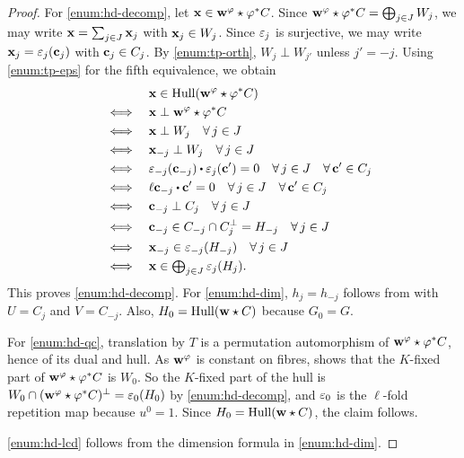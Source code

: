 \documentclass[twocolumn, 11pt]{scrartcl}
\begin{document}
\begin{proof}
    For \ref{enum:hd-decomp}, let $\mathbf{x}\in\mathbf{w}^\varphi\star\varphi^*C$. Since $\mathbf{w}^\varphi\star\varphi^*C=\bigoplus_{j\in J} W_j$, we may write $\mathbf{x}=\sum_{j\in J}\mathbf{x}_j$ with $\mathbf{x}_j\in W_j$. Since $\varepsilon_{j}$ is surjective, we may write $\mathbf{x}_{j}=\varepsilon_{j}(\mathbf{c}_j)$ with $\mathbf{c}_j\in C_j$. By \ref{enum:tp-orth}, $W_j\perp W_{j'}$ unless $j'=-j$. Using \ref{enum:tp-eps} for the fifth equivalence, we obtain
    \begin{align*}
             & \bfx\in\Hull(\bfw^\varphi\star\varphi^*C) \\
        \qiff& \bfx\perp\bfw^\varphi\star \varphi^*C \\
        \qiff& \bfx\perp W_j\quad\forall j\in J \\
        \qiff& \bfx_{-j}\perp W_j\quad\forall j\in J \\
        \qiff& \eps_{-j}(\bfc_{-j})\dotpr\eps_j(\bfc')=0\quad\forall j\in J\quad\forall \bfc'\in C_j \\
        \qiff& \ell\bfc_{-j}\dotpr\bfc'=0 \quad\forall j\in J\quad\forall\bfc'\in C_j \\
        \qiff& \bfc_{-j}\perp C_j\quad\forall j\in J \\
        \qiff& \bfc_{-j}\in C_{-j}\cap C_j^\perp=H_{-j}\quad\forall j\in J \\
        \qiff& \bfx_{-j}\in\eps_{-j}(H_{-j})\quad\forall j\in J \\
        \qiff& \textstyle \bfx\in\bigoplus_{j\in J}\eps_j(H_j).
    \end{align*}
    This proves \ref{enum:hd-decomp}. For \ref{enum:hd-dim}, $h_j=h_{-j}$ follows from  with $U=C_j$ and $V=C_{-j}$. Also, $H_0=\operatorname{Hull}(\mathbf{w}\star C)$ because $G_0=G$.
    
    For \ref{enum:hd-qc}, translation by $T$ is a permutation automorphism of $\mathbf{w}^\varphi\star\varphi^*C$, hence of its dual and hull. As $\mathbf{w}^\varphi$ is constant on fibres,  shows that the $K$-fixed part of $\mathbf{w}^\varphi\star\varphi^*C$ is $W_0$. So the $K$-fixed part of the hull is $W_0\cap(\mathbf{w}^\varphi\star\varphi^*C)^\perp=\varepsilon_0(H_0)$ by \ref{enum:hd-decomp}, and $\varepsilon_0$ is the $\ell$-fold repetition map because $u^0=1$. Since $H_0=\operatorname{Hull}(\mathbf{w}\star C)$, the claim follows.
    
    \ref{enum:hd-lcd} follows from the dimension formula in \ref{enum:hd-dim}.
\end{proof}
\end{document}
